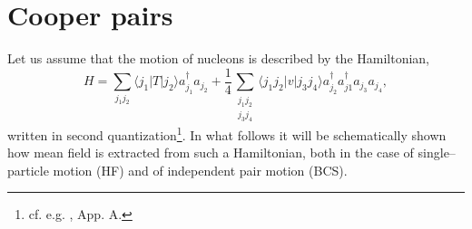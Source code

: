  \section{Cooper pairs}\label{App1D}
Let us assume that the motion of nucleons is described by the Hamiltonian, 
 \begin{equation*}
 H=\sum_{j_1j_2}\langle j_1|T|j_2\rangle a_{j_1}^{\dagger}a_{j_2}+\frac{1}{4}\sum_{\substack{j_1j_2\\j_3j_4}}\langle j_1j_2|v|j_3j_4\rangle a_{j_2}^{\dagger} a_{j1}^{\dagger} a_{j_3} a_{j_4},
 \end{equation*}
 written in second quantization\footnote{cf. e.g. \cite{Brink:05}, App. A.}.
In what follows it will be schematically shown how mean field is extracted from such a Hamiltonian, both in the case of single--particle motion (HF) and of independent pair motion (BCS).  





